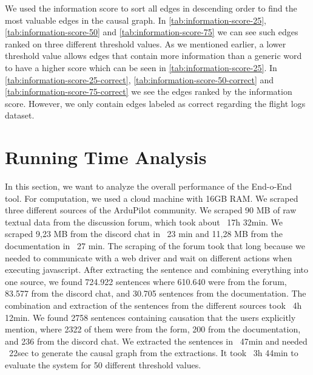 We used the information score to sort all edges in descending order to find the most valuable edges in the causal graph.
In \autoref{tab:information-score-25}, \autoref{tab:information-score-50} and \autoref{tab:information-score-75} we can see such edges ranked on three different threshold values.
As we mentioned earlier, a lower threshold value allows edges that contain more information than a generic word to have a higher score which can be seen in \autoref{tab:information-score-25}.
In \autoref{tab:information-score-25-correct}, \autoref{tab:information-score-50-correct} and \autoref{tab:information-score-75-correct} we see the edges ranked by the information score.
However, we only contain edges labeled as correct regarding the flight logs dataset.


\section{Running Time Analysis}\label{sec:end-to-end-performance}
In this section, we want to analyze the overall performance of the End-o-End tool.
For computation, we used a cloud machine with 16GB RAM.
We scraped three different sources of the ArduPilot community.
We scraped 90 MB of raw textual data from the discussion forum, which took about ~17h 32min.
We scraped 9,23 MB from the discord chat in ~23 min and 11,28 MB from the documentation in ~27 min.
The scraping of the forum took that long because we needed to communicate with a web driver and wait on different actions when executing javascript.
After extracting the sentence and combining everything into one source, we found 724.922 sentences where 610.640 were from the forum, 83.577 from the discord chat, and 30.705 sentences from the documentation.
The combination and extraction of the sentences from the different sources took ~4h 12min.
We found 2758 sentences containing causation that the users explicitly mention, where 2322 of them were from the form, 200 from the documentation, and 236 from the discord chat.
We extracted the sentences in ~47min and needed ~22sec to generate the causal graph from the extractions.
It took ~3h 44min to evaluate the system for 50 different threshold values.
